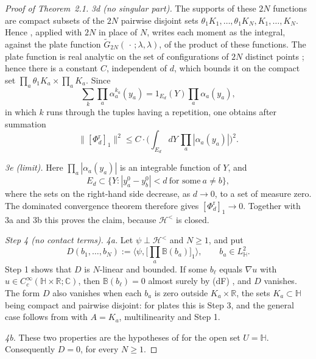 \documentclass[11pt]{amsart}
\theoremstyle{definition}
\begin{document}
\begin{proof}[Proof of Theorem~2.1]
\emph{3d (no singular part).} The supports of these $2N$ functions are compact subsets of the $2N$ pairwise disjoint sets $\theta_1K_1,\dots,\theta_1K_N,K_1,\dots,K_N$.
Hence \cite[Proposition~14.44]{QEDII}, applied with $2N$ in place of $N$, writes each moment as the integral, against the plate function $\tilde G_{2N}(\,\cdot\,;\lambda,\lambda)$, of the product of these functions.
The plate function is real analytic on the set of configurations of $2N$ distinct points \cite[Lemma~14.35\,(e)]{QEDII}; hence there is a constant $C$, independent of $d$, which bounds it on the compact set $\prod_a\theta_1K_a\times\prod_aK_a$.
Since
\begin{equation*}
\sum_k\prod_a\alpha_a^{k_a}(y_a)=1_{E_d}(Y)\prod_a\alpha_a(y_a),
\end{equation*}
in which $k$ runs through the tuples having a repetition, one obtains after summation
\begin{equation*}
\|[\Phi^{\mathrm r}_d]_1\|^2\le C\cdot\Big(\int_{E_d}dY\,\prod_a|\alpha_a(y_a)|\Big)^2.
\end{equation*}

\emph{3e (limit).} Here $\prod_a|\alpha_a(y_a)|$ is an integrable function of $Y$, and
\begin{equation*}
E_d\subset\{Y:|y_a^0-y_b^0|<d\ \text{for some}\ a\ne b\},
\end{equation*}
where the sets on the right-hand side decrease, as $d\to0$, to a set of measure zero.
The dominated convergence theorem therefore gives $[\Phi^{\mathrm r}_d]_1\to0$.
Together with 3a and 3b this proves the claim, because $\mathcal H^{<}$ is closed.

\emph{Step 4 (no contact terms).}
\emph{4a.} Let $\psi\perp\mathcal H^{<}$ and $N\ge1$, and put
\begin{equation*}
D(b_1,\dots,b_N):=\Big\langle\psi,\Big[\prod_a\mathbb B(b_a)\Big]_1\Big\rangle,\qquad b_a\in L^2_{\mathbb H}.
\end{equation*}
Step 1 shows that $D$ is $N$-linear and bounded.
If some $b_\ell$ equals $\nabla u$ with $u\in C_c^\infty(\mathbb H\times\mathbb R;\mathbb C)$, then $\mathbb B(b_\ell)=0$ almost surely by (dF) \cite[Definition~14.2\,(a)]{QEDII}, and $D$ vanishes.
The form $D$ also vanishes when each $b_a$ is zero outside $K_a\times\mathbb R$, the sets $K_a\subset\mathbb H$ being compact and pairwise disjoint: for plates this is Step 3, and the general case follows from \cite[Lemma~14.8\,(a)]{QEDII} with $A=K_a$, multilinearity and Step 1.

\emph{4b.} These two properties are the hypotheses of \cite[Proposition~14.13]{QEDII} for the open set $U=\mathbb H$.
Consequently $D=0$, for every $N\ge1$.


\end{proof}
\end{document}
